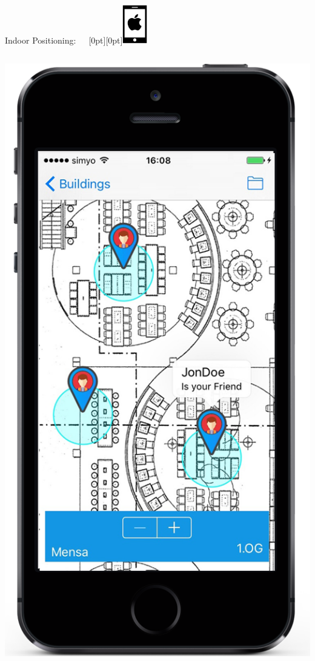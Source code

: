 \documentclass[11pt]{beamer}
\begin{document}
\begin{frame}{Indoor Positioning:~~~\raisebox{-10pt}[0pt][0pt]{\includegraphics[width=0.08\textwidth]{tech-stack-apple}}}
\begin{columns}[T]
    \begin{column}{.4\textwidth}
      \includegraphics[scale=0.25]{mappinpointc}
    \end{column}

  \end{columns}

\end{frame}
\end{document}
